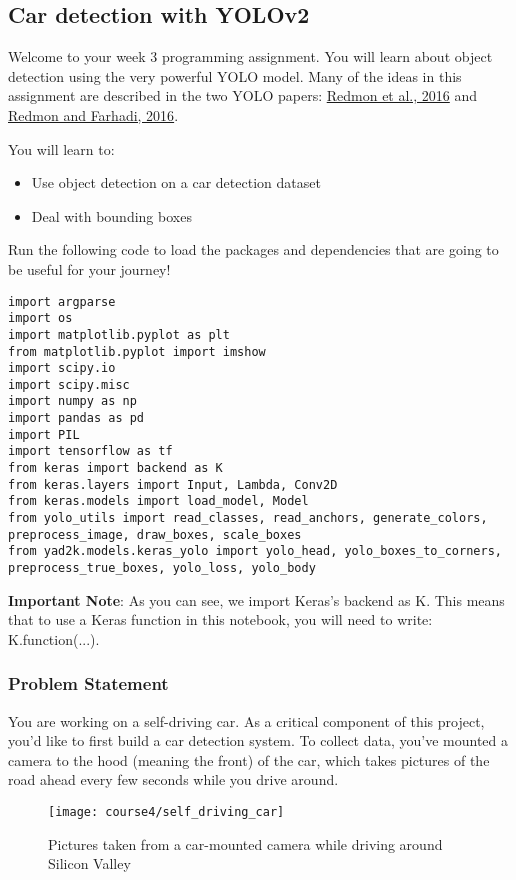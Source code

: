 \subsection{Car detection with YOLOv2}

Welcome to your week 3 programming assignment. You will learn about object detection using the very powerful YOLO model. Many of the ideas in this assignment are described in the two YOLO papers: \href{https://arxiv.org/abs/1506.02640}{Redmon et al., 2016} and \href{https://arxiv.org/abs/1612.08242}{Redmon and Farhadi, 2016}.

You will learn to:
\begin{itemize}
\item Use object detection on a car detection dataset
\item Deal with bounding boxes
\end{itemize}

Run the following code to load the packages and dependencies that are going to be useful for your journey!
\begin{verbatim}
import argparse
import os
import matplotlib.pyplot as plt
from matplotlib.pyplot import imshow
import scipy.io
import scipy.misc
import numpy as np
import pandas as pd
import PIL
import tensorflow as tf
from keras import backend as K
from keras.layers import Input, Lambda, Conv2D
from keras.models import load_model, Model
from yolo_utils import read_classes, read_anchors, generate_colors, preprocess_image, draw_boxes, scale_boxes
from yad2k.models.keras_yolo import yolo_head, yolo_boxes_to_corners, preprocess_true_boxes, yolo_loss, yolo_body

\end{verbatim}

{\textbf{Important Note}}: As you can see, we import Keras's backend as K. This means that to use a Keras function in this notebook, you will need to write: K.function(...).
\clearpage
\subsubsection{Problem Statement}

You are working on a self-driving car. As a critical component of this project, you'd like to first build a car detection system. To collect data, you've mounted a camera to the hood (meaning the front) of the car, which takes pictures of the road ahead every few seconds while you drive around.
\begin{figure}[h]
\begin{center}
\texttt{[image: course4/self\_driving\_car]}
\caption{Pictures taken from a car-mounted camera while driving around Silicon Valley}
\end{center}
\end{figure}

